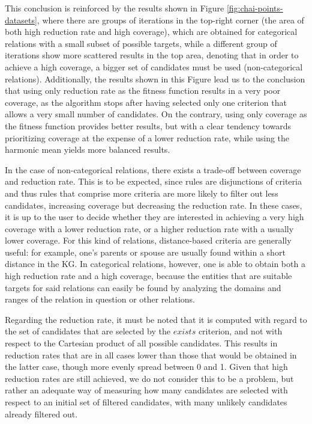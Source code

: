 This conclusion is reinforced by the results shown in Figure \ref{fig:chai-points-datasets}, where there are groups of iterations in the top-right corner (the area of both high reduction rate and high coverage), which are obtained for categorical relations with a small subset of possible targets, while a different group of iterations show more scattered results in the top area, denoting that in order to achieve a high coverage, a bigger set of candidates must be used (non-categorical relations). Additionally, the results shown in this Figure lead us to the conclusion that using only reduction rate as the fitness function results in a very poor coverage, as the algorithm stops after having selected only one criterion that allows a very small number of candidates. On the contrary, using only coverage as the fitness function provides better results, but with a clear tendency towards prioritizing coverage at the expense of a lower reduction rate, while using the harmonic mean yields more balanced results.

In the case of non-categorical relations, there exists a trade-off between coverage and reduction rate. This is to be expected, since rules are disjunctions of criteria and thus rules that comprise more criteria are more likely to filter out less candidates, increasing coverage but decreasing the reduction rate. In these cases, it is up to the user to decide whether they are interested in achieving a very high coverage with a lower reduction rate, or a higher reduction rate with a usually lower coverage. For this kind of relations, distance-based criteria are generally useful: for example, one's parents or spouse are usually found within a short distance in the KG. In categorical relations, however, one is able to obtain both a high reduction rate and a high coverage, because the entities that are suitable targets for said relations can easily be found by analyzing the domains and ranges of the relation in question or other relations.

Regarding the reduction rate, it must be noted that it is computed with regard to the set of candidates that are selected by the $exists$ criterion, and not with respect to the Cartesian product of all possible candidates. This results in reduction rates that are in all cases lower than those that would be obtained in the latter case, though more evenly spread between 0 and 1. Given that high reduction rates are still achieved, we do not consider this to be a problem, but rather an adequate way of measuring how many candidates are selected with respect to an initial set of filtered candidates, with many unlikely candidates already filtered out.

